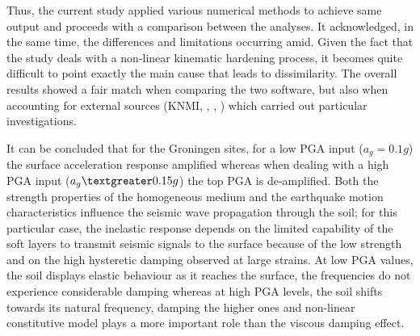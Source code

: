 	Thus, the current study applied various numerical methods to achieve same output and proceeds with a comparison between the analyses. It acknowledged, in the same time, the differences and limitations occurring amid. Given the fact that the study deals with a non-linear kinematic hardening process, it becomes quite difficult to point exactly the main cause that leads to dissimilarity. The overall results showed a fair match when comparing the two software, but also when accounting for external sources (KNMI, \cite{dost2012monitoring}, \cite{dost2004scaling}, \cite{dost2013august}) which carried out particular investigations. 
	
	It can be concluded that for the Groningen sites, for a low PGA input ($a_g=0.1g$) the surface acceleration response amplified whereas when dealing with a high PGA input ($a_g\textgreater0.15g$) the top PGA is de-amplified. Both the strength properties of the homogeneous medium and the earthquake motion characteristics influence the seismic wave propagation through the soil; for this particular case, the inelastic response depends on the limited capability of the soft layers to transmit seismic signals to the surface because of the low strength and on the high hysteretic damping observed at large strains. At low PGA values, the soil displays elastic behaviour as it reaches the surface, the frequencies do not experience considerable damping whereas at high PGA levels, the soil shifts towards its natural frequency, damping the higher ones and non-linear constitutive model plays a more important role than the viscous damping effect.